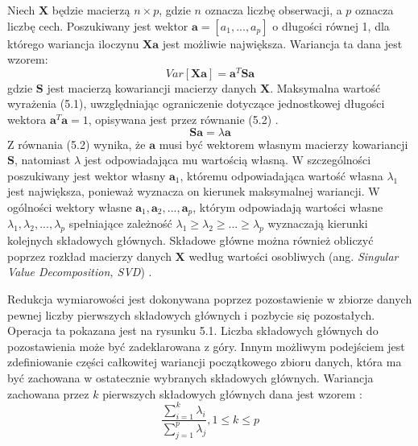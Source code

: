 \documentclass[notitlepage]{report}
\begin{document}
Niech $\mathbf{X}$ będzie macierzą $n \times p$, gdzie $n$ oznacza liczbę obserwacji, a $p$ oznacza liczbę cech. Poszukiwany jest wektor $\textbf{a} = [a_1,...,a_p]$ o długości równej 1, dla którego wariancja iloczynu $\mathbf{Xa}$ jest możliwie największa. Wariancja ta dana jest wzorem:
\begin{equation}
Var[\mathbf{Xa}] = \mathbf{a}^T\mathbf{Sa}
\end{equation}
gdzie $\mathbf{S}$ jest macierzą kowariancji macierzy danych $\mathbf{X}$. Maksymalna wartość wyrażenia (5.1), uwzględniając ograniczenie dotyczące jednostkowej długości wektora $\textbf{a}^T\textbf{a} = 1$, opisywana jest przez równanie (5.2) \cite{tharwat} \cite{joliffe}.
\begin{equation}
\mathbf{Sa} = \lambda \mathbf{a}
\end{equation}
Z równania (5.2) wynika, że $\mathbf{a}$ musi być wektorem własnym macierzy kowariancji $\mathbf{S}$, natomiast $\lambda$ jest odpowiadająca mu wartością własną. W szczególności poszukiwany jest wektor własny $\mathbf{a}_1$, któremu odpowiadająca wartość własna $\lambda_1$ jest największa, ponieważ wyznacza on kierunek maksymalnej wariancji. W ogólności wektory własne $\mathbf{a}_1, \mathbf{a}_2, ..., \mathbf{a}_p$, którym odpowiadają wartości własne $\lambda_1, \lambda_2, ..., \lambda_p$ spełniające zależność $ \lambda_1 \ge \lambda_2 \ge ... \ge \lambda_p$ wyznaczają kierunki kolejnych składowych głównych. Składowe główne można również obliczyć poprzez rozkład macierzy danych $\mathbf{X}$ według wartości osobliwych (ang. \textit{Singular Value Decomposition, SVD}) \cite{tharwat} \cite{joliffe} \cite{gewers}. 

Redukcja wymiarowości jest dokonywana poprzez pozostawienie w zbiorze danych pewnej liczby pierwszych składowych głównych i pozbycie się pozostałych. Operacja ta pokazana jest na rysunku 5.1. Liczba składowych głównych do pozostawienia może być zadeklarowana z góry. Innym możliwym podejściem jest zdefiniowanie części całkowitej wariancji początkowego zbioru danych, która ma być zachowana w ostatecznie wybranych składowych głównych. Wariancja zachowana przez $k$ pierwszych składowych głównych dana jest wzorem \cite{tharwat} \cite{joliffe} \cite{gewers}:
\begin{equation}
\frac{\sum_{i=1}^{k}\lambda_i}{\sum_{j=1}^{p}\lambda_j}, 1 \leq k \leq p
\end{equation}
\end{document}
